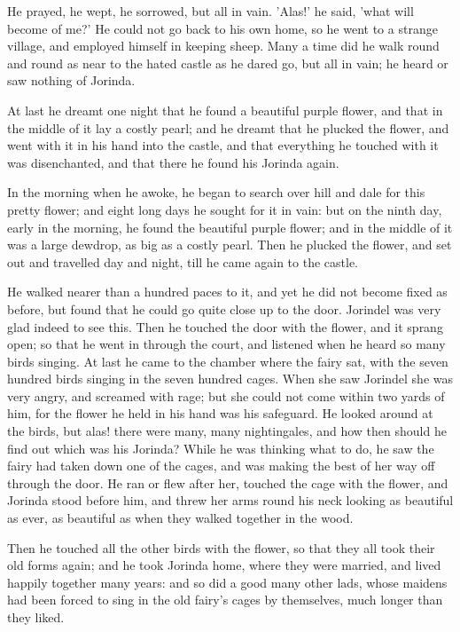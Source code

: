 \documentclass[12pt]{book}
\begin{document}
He prayed, he wept, he sorrowed, but all in vain. 'Alas!' he said,
'what will become of me?' He could not go back to his own home, so he
went to a strange village, and employed himself in keeping sheep. Many
a time did he walk round and round as near to the hated castle as he
dared go, but all in vain; he heard or saw nothing of Jorinda.

At last he dreamt one night that he found a beautiful purple flower,
and that in the middle of it lay a costly pearl; and he dreamt that he
plucked the flower, and went with it in his hand into the castle, and
that everything he touched with it was disenchanted, and that there he
found his Jorinda again.

In the morning when he awoke, he began to search over hill and dale
for this pretty flower; and eight long days he sought for it in vain:
but on the ninth day, early in the morning, he found the beautiful
purple flower; and in the middle of it was a large dewdrop, as big as
a costly pearl. Then he plucked the flower, and set out and travelled
day and night, till he came again to the castle.

He walked nearer than a hundred paces to it, and yet he did not become
fixed as before, but found that he could go quite close up to the
door. Jorindel was very glad indeed to see this. Then he touched the
door with the flower, and it sprang open; so that he went in through
the court, and listened when he heard so many birds singing. At last
he came to the chamber where the fairy sat, with the seven hundred
birds singing in the seven hundred cages. When she saw Jorindel she
was very angry, and screamed with rage; but she could not come within
two yards of him, for the flower he held in his hand was his
safeguard. He looked around at the birds, but alas! there were many,
many nightingales, and how then should he find out which was his
Jorinda? While he was thinking what to do, he saw the fairy had taken
down one of the cages, and was making the best of her way off through
the door. He ran or flew after her, touched the cage with the flower,
and Jorinda stood before him, and threw her arms round his neck
looking as beautiful as ever, as beautiful as when they walked
together in the wood.

Then he touched all the other birds with the flower, so that they all
took their old forms again; and he took Jorinda home, where they were
married, and lived happily together many years: and so did a good many
other lads, whose maidens had been forced to sing in the old fairy's
cages by themselves, much longer than they liked.
\end{document}

